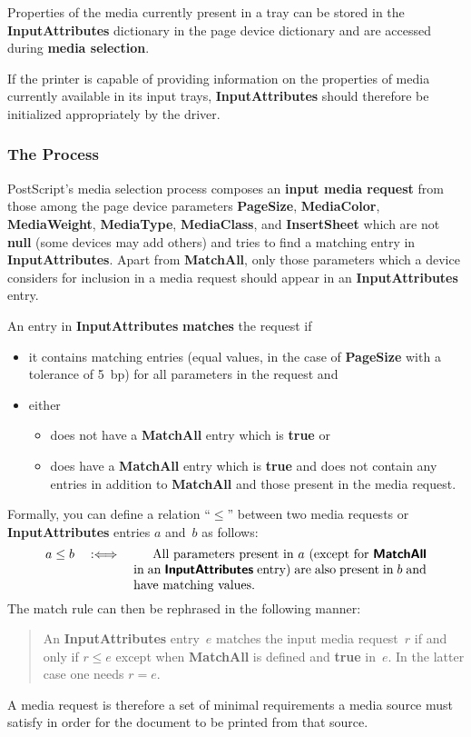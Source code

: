 \documentclass[twoside,a4paper]{article}
\newcommand{\ps}[1]{{\sffamily\bfseries #1}}	%
\renewcommand{\d}[1]{{\bfseries #1}}	%
\begin{document}
Properties of the media currently present in a tray can be stored in the
\ps{InputAttributes} dictionary in the page device dictionary and are
accessed during \d{media selection}.

If the printer is capable of providing information on the properties of media
currently available in its input trays,
\ps{InputAttributes} should therefore be initialized appropriately
by the driver.


\subsubsection{The Process}

PostScript's media selection process composes an \d{input media request} from
those among the page device parameters
\ps{PageSize}, \ps{MediaColor}, \ps{MediaWeight}, \ps{MediaType},
\ps{MediaClass}, and \ps{InsertSheet}
which are not \ps{null} (some devices may add others) and
tries to find a matching entry in \ps{InputAttributes}.
Apart from \ps{MatchAll}, only those parameters which a device
considers for inclusion in a media request should appear in an
\ps{InputAttributes} entry.

An entry in \ps{InputAttributes} \d{matches} the request if
\begin{itemize}
  \item it contains matching entries (equal values, in the case of
    \ps{PageSize} with a tolerance of 5~bp) for all parameters in the
    request and
  \item either
    \begin{itemize}
      \item does not have a \ps{MatchAll} entry which is \ps{true} or
      \item does have a \ps{MatchAll} entry which is \ps{true} and
	does not contain any entries in addition to \ps{MatchAll} and those
	present in the media request.
    \end{itemize}
\end{itemize}
Formally, you can define a relation ``$\leq$'' between two media requests or
\ps{InputAttributes} entries $a$ and~$b$ as follows:
\begin{displaymath}
  a \leq b \quad :\Longleftrightarrow \quad
  \vtop{\advance\hsize by -4cm
    All parameters present in $a$ (except for \ps{MatchAll} in an
    \ps{InputAttributes} entry) are also present in~$b$ and have matching
    values.}
\end{displaymath}
The match rule can then be rephrased in the following manner:
\begin{quote}
  An \ps{InputAttributes} entry~$e$ matches the input media request~$r$
  if and only if $r \leq e$
  except when \ps{MatchAll} is defined and \ps{true} in~$e$.
  In the latter case one needs $r = e$.
\end{quote}
A media request is therefore a set of minimal requirements a media source must
satisfy in order for the document to be printed from that source.
\end{document}
